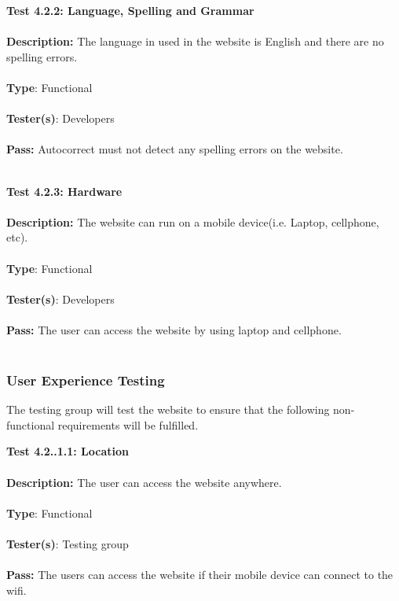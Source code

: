 \documentclass[12pt]{article}
\begin{document}
\begin{tcolorbox}
\textbf{Test 4.2.2: Language, Spelling and Grammar} \\ \\
\textbf{Description:} The language in used in the website is English and there are no spelling errors. \\ \\
\textbf{Type}: Functional \\ \\
\textbf{Tester(s)}: Developers \\ \\
\textbf{Pass:} Autocorrect must not detect any spelling errors on the website. \\ \\
\end{tcolorbox}

\begin{tcolorbox}
\textbf{Test 4.2.3: Hardware} \\ \\
\textbf{Description:} The website can run on a mobile device(i.e. Laptop, cellphone, etc). \\ \\
\textbf{Type}: Functional \\ \\
\textbf{Tester(s)}: Developers \\ \\
\textbf{Pass:} The user can access the website by using laptop and cellphone. \\ \\
\end{tcolorbox}

\subsubsection{User Experience Testing}
The testing group will test the website to ensure that the following non-functional requirements will be fulfilled.

\begin{tcolorbox}
\textbf{Test 4.2..1.1: Location} \\ \\
\textbf{Description:} The user can access the website anywhere. \\ \\
\textbf{Type}: Functional  \\ \\
\textbf{Tester(s)}: Testing group \\ \\
\textbf{Pass:} The users can access the website if their mobile device can connect to the wifi. \\ \\
\end{tcolorbox}
\end{document}
